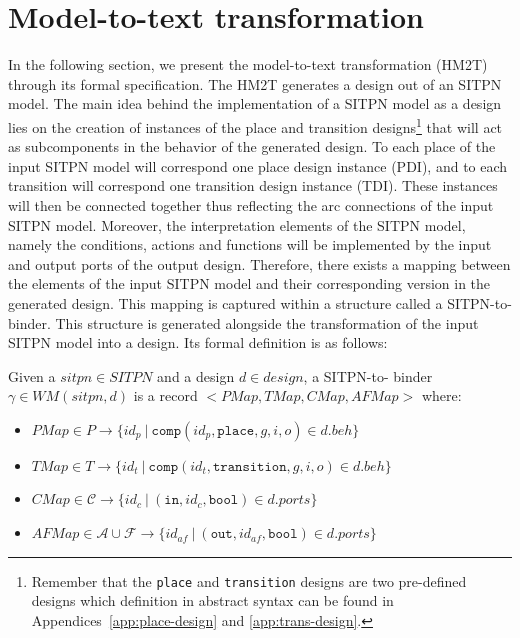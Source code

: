 \section{Model-to-text transformation}
\label{sec:m2t}

In the following section, we present the \hilecop{} model-to-text
transformation (HM2T) through its formal specification.  The HM2T
generates a \hvhdl{} design out of an SITPN model.  The main idea
behind the implementation of a SITPN model as a \hvhdl{} design lies
on the creation of instances of the place and transition
designs\footnote{Remember that the \texttt{place} and
  \texttt{transition} designs are two pre-defined designs which
  definition in abstract syntax can be found in
  Appendices~\ref{app:place-design} and \ref{app:trans-design}.} that
will act as subcomponents in the behavior of the generated design. To
each place of the input SITPN model will correspond one place design
instance (PDI), and to each transition will correspond one transition
design instance (TDI). These instances will then be connected together
thus reflecting the arc connections of the input SITPN
model. Moreover, the interpretation elements of the SITPN model,
namely the conditions, actions and functions will be implemented by
the input and output ports of the output design. Therefore, there
exists a mapping between the elements of the input SITPN model and
their corresponding version in the generated \hvhdl{} design. This
mapping is captured within a structure called a SITPN-to-\hvhdl{}
binder.  This structure is generated alongside the transformation of
the input SITPN model into a \hvhdl{} design. Its formal definition is
as follows:
\begin{definition}
  \label{def:sitpn-to-hvhdl-binder}
  Given a $sitpn\in{}SITPN$ and a \hvhdl{} design $d\in{}design$, a
  SITPN-to-\hvhdl{} binder $\gamma\in{}WM(sitpn,d)$ is a record
  ${<}PMap,TMap,CMap,AFMap{>}$ where:
  \begin{itemize}
  \item $PMap\in{}P\rightarrow{}\{id_p~|~\mathtt{comp}(id_p,\mathtt{place},g,i,o)\in{}d.beh\}$
  \item $TMap\in{}T\rightarrow{}\{id_t~|~\mathtt{comp}(id_t,\mathtt{transition},g,i,o)\in{}d.beh\}$
  \item $CMap\in\mathcal{C}\rightarrow\{id_c~|~(\mathtt{in}, id_c, \mathtt{bool})\in{}d.ports\}$
  \item $AFMap\in\mathcal{A}\cup\mathcal{F}\rightarrow\{id_{af}~|~(\mathtt{out}, id_{af}, \mathtt{bool})\in{}d.ports\}$
  \end{itemize}
\end{definition}

